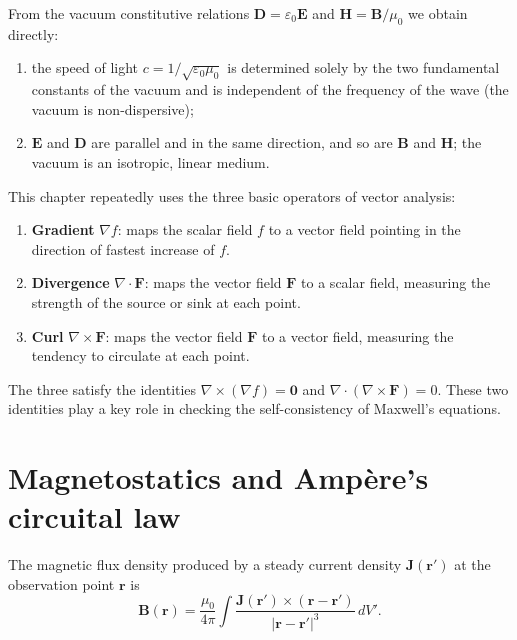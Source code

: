 \begin{property}\label{ch21_vacuum_props}
From the vacuum constitutive relations $\mathbf{D}=\varepsilon_0\mathbf{E}$ and $\mathbf{H}=\mathbf{B}/\mu_0$ we obtain directly:
\begin{enumerate}[label=(\roman*)]
    \item the speed of light $c = 1/\sqrt{\varepsilon_0\mu_0}$ is determined solely by the two fundamental constants of the vacuum and is independent of the frequency of the wave (the vacuum is non-dispersive);
    \item $\mathbf{E}$ and $\mathbf{D}$ are parallel and in the same direction, and so are $\mathbf{B}$ and $\mathbf{H}$; the vacuum is an isotropic, linear medium.
\end{enumerate}
\end{property}

\begin{remark}\label{rem:three_operators}
This chapter repeatedly uses the three basic operators of vector analysis:
\begin{enumerate}[label=(\roman*)]
    \item \textbf{Gradient} $\nabla f$: maps the scalar field $f$ to a vector field pointing in the direction of fastest increase of $f$.
    \item \textbf{Divergence} $\nabla \cdot \mathbf{F}$: maps the vector field $\mathbf{F}$ to a scalar field, measuring the strength of the source or sink at each point.
    \item \textbf{Curl} $\nabla \times \mathbf{F}$: maps the vector field $\mathbf{F}$ to a vector field, measuring the tendency to circulate at each point.
\end{enumerate}
The three satisfy the identities $\nabla \times (\nabla f) = \mathbf{0}$ and $\nabla \cdot (\nabla \times \mathbf{F}) = 0$. These two identities play a key role in checking the self-consistency of Maxwell's equations.
\end{remark}

\section{Magnetostatics and Amp\`ere's circuital law}

\begin{lemma}\label{ch21_biot_savart}
The magnetic flux density produced by a steady current density $\mathbf{J}(\mathbf{r}')$ at the observation point $\mathbf{r}$ is
\[
\mathbf{B}(\mathbf{r}) = \frac{\mu_0}{4\pi} \int \frac{\mathbf{J}(\mathbf{r}') \times (\mathbf{r}-\mathbf{r}')}{|\mathbf{r}-\mathbf{r}'|^3}\, dV'.
\]
\end{lemma}


